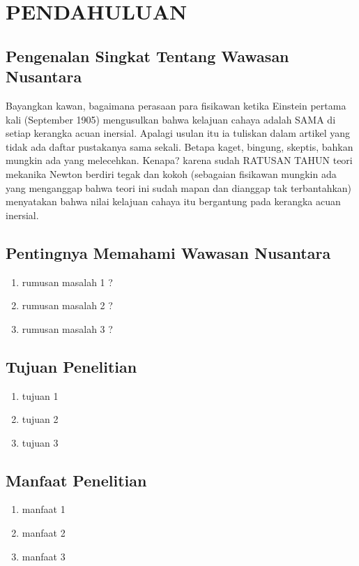 \chapter{PENDAHULUAN}
\section{Pengenalan Singkat Tentang Wawasan Nusantara}
Bayangkan kawan, bagaimana perasaan para fisikawan ketika Einstein pertama kali (September 1905) mengusulkan bahwa kelajuan  cahaya adalah SAMA di setiap kerangka acuan inersial. Apalagi usulan itu ia tuliskan dalam artikel yang tidak ada daftar pustakanya sama sekali. Betapa kaget, bingung, skeptis, bahkan mungkin ada yang melecehkan. Kenapa? karena sudah RATUSAN TAHUN teori mekanika Newton berdiri tegak dan kokoh (sebagaian fisikawan mungkin ada yang menganggap bahwa teori ini sudah mapan dan dianggap tak terbantahkan) menyatakan bahwa nilai kelajuan cahaya itu bergantung pada kerangka acuan inersial. 

\section{Pentingnya Memahami Wawasan Nusantara}
\begin{enumerate}
\item rumusan masalah 1 ?
\item rumusan masalah 2 ?
\item rumusan masalah 3 ?
\end{enumerate}

\section{Tujuan Penelitian}
\begin{enumerate}
\item tujuan 1
\item tujuan 2
\item tujuan 3
\end{enumerate}

\section{Manfaat Penelitian}
\begin{enumerate}
\item manfaat 1
\item manfaat 2
\item manfaat 3
\end{enumerate}
